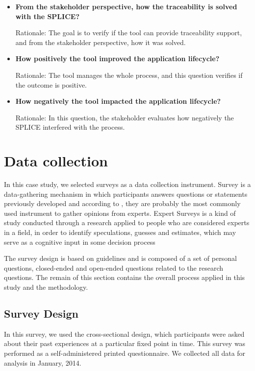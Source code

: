 \begin{itemize}
\item \textbf{From the stakeholder perspective, how the traceability is solved with the \ac{SPLICE}?}

Rationale: The goal is to verify if the tool can provide traceability support, and from the stakeholder perspective, how it was solved.

\item \textbf{How positively the tool improved the application lifecycle?}

Rationale: The tool manages the whole process, and this question verifies if the outcome is positive.
\item \textbf{How negatively the tool impacted the application lifecycle?}

Rationale: In this question, the stakeholder evaluates how negatively the \ac{SPLICE} interfered with the process.
\end{itemize}



\section{Data collection}
\label{sc:researchMethod}

In this case study, we selected surveys as a data collection instrument. Survey  is  a  data-gathering  mechanism  in  which participants answers  questions  or  statements  previously developed and according to \cite{Kitchenham2008} , they are probably  the  most  commonly used instrument to gather opinions from experts. Expert Surveys is a kind of study conducted through a research  applied  to  people  who  are  considered  experts  in  a  field,  in  order  to  identify speculations,  guesses  and  estimates,  which  may  serve  as  a  cognitive  input  in  some decision process \citep{Chhibber1992} 


The survey design is based on \cite{Kitchenham2008} guidelines and is composed of a set of personal questions, closed-ended and open-ended questions related to the research questions. The remain of this section contains the overall process applied in this study and the methodology.

\subsection{Survey Design}

In  this  survey,  we  used  the  cross-sectional  design,  which  participants  were  asked  about  their  past  experiences  at  a  particular  fixed point in time. This survey was performed as a self-administered printed questionnaire. We  collected  all  data  for  analysis in January, 2014.  

